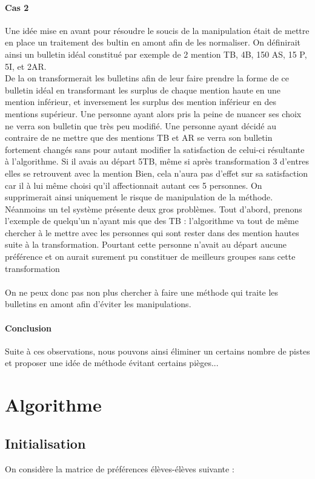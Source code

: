 \documentclass[10pt,a4paper]{scrartcl}
\begin{document}
\paragraph{Cas 2}
Une idée mise en avant pour résoudre le soucis de la manipulation était de mettre en place un traitement des bultin en amont afin de les normaliser.
On définirait ainsi un bulletin idéal constitué par exemple de 2 mention TB, 4B, 150 AS, 15 P, 5I, et 2AR.\\
De la on transformerait les bulletins afin de leur faire prendre la forme de ce bulletin idéal en transformant les surplus de chaque mention haute en une mention inférieur, et inversement les surplus des mention inférieur en des mentions supérieur.
Une personne ayant alors pris la peine de nuancer ses choix ne verra son bulletin que très peu modifié. Une personne ayant décidé au contraire de ne mettre que des mentions TB et AR se verra son bulletin fortement changés sans pour autant modifier la satisfaction de celui-ci résultante à l'algorithme. Si il avais au départ 5TB, même si après transformation 3 d'entres elles se retrouvent avec la mention Bien, cela n'aura pas d'effet sur sa satisfaction car il à lui même choisi qu'il affectionnait autant ces 5 personnes. On supprimerait ainsi uniquement le risque de manipulation de la méthode.\\
Néanmoins un tel système présente deux gros problèmes. Tout d'abord, prenons l'exemple de quelqu'un n'ayant mis que des TB : l'algorithme va tout de même chercher à le mettre avec les personnes qui sont rester dans des mention hautes suite à la transformation. Pourtant cette personne n'avait au départ aucune préférence et on aurait surement pu constituer de meilleurs groupes sans cette transformation\\
\\
On ne peux donc pas non plus chercher à faire une méthode qui traite les bulletins en amont afin d'éviter les manipulations.
\paragraph{Conclusion}
Suite à ces observations, nous pouvons ainsi éliminer un certains nombre de pistes et proposer une idée de méthode évitant certains pièges...

\section{Algorithme}
\subsection{Initialisation}
On considère la matrice de préférences élèves-élèves suivante :
\end{document}
